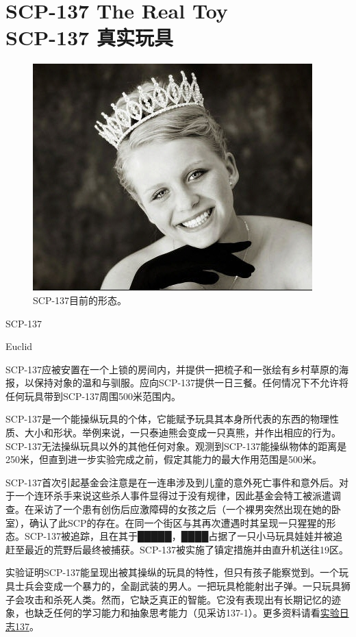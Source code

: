 \chapter[SCP-137 真实玩具]{
    SCP-137 The Real Toy\\
    SCP-137 真实玩具
}

\label{chap:SCP-137}

\begin{figure}[H]
    \centering
    \includegraphics[width=0.5\linewidth]{images/SCP-137.jpg}
    \caption*{SCP-137目前的形态。}
\end{figure}

SCP-137

Euclid

SCP-137应被安置在一个上锁的房间内，并提供一把梳子和一张绘有乡村草原的海报，以保持对象的温和与驯服。应向SCP-137提供一日三餐。任何情况下不允许将任何玩具带到SCP-137周围500米范围内。

SCP-137是一个能操纵玩具的个体，它能赋予玩具其本身所代表的东西的物理性质、大小和形状。举例来说，一只泰迪熊会变成一只真熊，并作出相应的行为。SCP-137无法操纵玩具以外的其他任何对象。观测到SCP-137能操纵物体的距离是250米，但直到进一步实验完成之前，假定其能力的最大作用范围是500米。

SCP-137首次引起基金会注意是在一连串涉及到儿童的意外死亡事件和意外后。对于一个连环杀手来说这些杀人事件显得过于没有规律，因此基金会特工被派遣调查。在采访了一个患有创伤后应激障碍的女孩之后（一个裸男突然出现在她的卧室），确认了此SCP的存在。在同一个街区与其再次遭遇时其呈现一只猩猩的形态。SCP-137被追踪，且在其于█████，████占据了一只小马玩具娃娃并被追赶至最近的荒野后最终被捕获。SCP-137被实施了镇定措施并由直升机送往19区。

实验证明SCP-137能呈现出被其操纵的玩具的特性，但只有孩子能察觉到。一个玩具士兵会变成一个暴力的，全副武装的男人。一把玩具枪能射出子弹。一只玩具狮子会攻击和杀死人类。然而，它缺乏真正的智能。它没有表现出有长期记忆的迹象，也缺乏任何的学习能力和抽象思考能力（见采访137-1）。更多资料请看\hyperref[sec:DOC-experiment-log-137]{实验日志137}。

